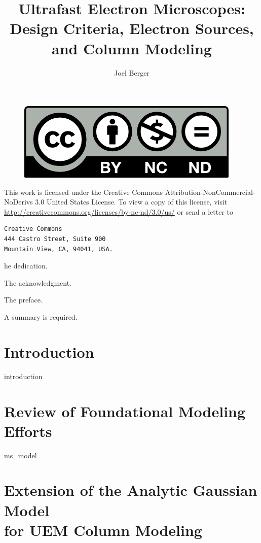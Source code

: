 \documentclass{uicthesi}
\title{Ultrafast Electron Microscopes: Design Criteria, Electron Sources, and Column Modeling}
\author{Joel Berger}
\begin{document}
\maketitle

\newpage
\begin{figure}
  \centering
  \includegraphics{by-nc-nd}
\end{figure}
This work is licensed under the Creative Commons Attribution-NonCommercial-NoDerivs 3.0 United States License.
To view a copy of this license, visit \url{http://creativecommons.org/licenses/by-nc-nd/3.0/us/} or send a letter to
\begin{verbatim}
Creative Commons
444 Castro Street, Suite 900
Mountain View, CA, 94041, USA.
\end{verbatim}


\dedication
The dedication.
 
\acknowledgment
The acknowledgment.
 
\preface
The preface.
 
\tableofcontents
\listoffigures
 

 
\summary
A summary is required.

\chapter{Introduction}

  {introduction}

\chapter{Review of Foundational Modeling Efforts} \label{chap:previous_models}

  {ms_model}

\chapter{Extension of the Analytic Gaussian Model\\for UEM Column Modeling} \label{chap:extension}
\end{document}
